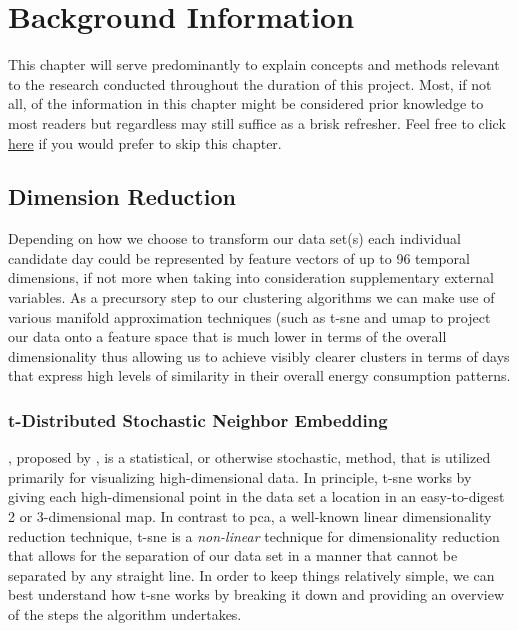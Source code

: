 \chapter{Background Information}
\label{ch:Background-Information}
This chapter will serve predominantly to explain concepts and methods relevant to the research conducted throughout the duration of this project. Most, if not all, of the information in this chapter might be considered prior knowledge to most readers but regardless may still suffice as a brisk refresher. Feel free to click \hyperref[ch:Data-Description]{here} if you would prefer to skip this chapter.

\section{Dimension Reduction}
\label{sec:Background-Information:Dimension-Reduction}
Depending on how we choose to transform our data set(s) each individual candidate day could be represented by feature vectors of up to 96 temporal dimensions, if not more when taking into consideration supplementary external variables. As a precursory step to our clustering algorithms we can make use of various manifold approximation techniques (such as \gls{t-sne} and \gls{umap} to project our data onto a feature space that is much lower in terms of the overall dimensionality thus allowing us to achieve visibly clearer clusters in terms of days that express high levels of similarity in their overall energy consumption patterns.

\subsection{t-Distributed Stochastic Neighbor Embedding}
\label{subsec:Background-Information:Dimension-Reduction:t-Distributed-Stochastic-Neighbor-Embedding}
, proposed by \citet{Laurens}, is a statistical, or otherwise stochastic, method, that is utilized primarily for visualizing high-dimensional data. In principle, \gls{t-sne} works by giving each high-dimensional point in the data set a location in an easy-to-digest 2 or 3-dimensional map. In contrast to \gls{pca}, a well-known linear dimensionality reduction technique, \gls{t-sne} is a \textit{non-linear} technique for dimensionality reduction that allows for the separation of our data set in a manner that cannot be separated by any straight line. In order to keep things relatively simple, we can best understand how \gls{t-sne} works by breaking it down and providing an overview of the steps the algorithm undertakes.

